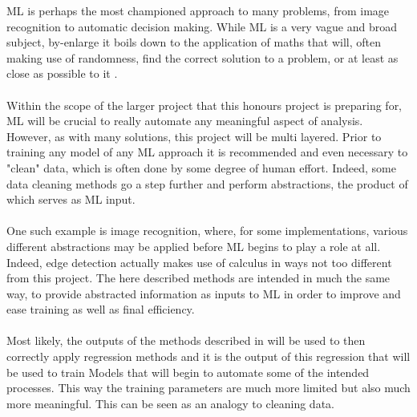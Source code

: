 \documentclass[main.tex]{subfiles}
\begin{document}
    ML is perhaps the most championed approach to many problems, from image recognition to automatic decision making. While ML is a very vague and broad subject, by-enlarge it boils down to the application of maths that will, often making use of randomness, find the correct solution to a problem, or at least as close as possible to it \cite[Page~5]{definitionML}.
    \\\\
    Within the scope of the larger project that this honours project is preparing for, ML will be crucial to really automate any meaningful aspect of analysis. However, as with many solutions, this project will be multi layered. Prior to training any model of any ML approach  it is recommended and even necessary to "clean" data, which is often done by some degree of human effort. Indeed, some data cleaning methods go a step further and perform abstractions, the product of which serves as ML input. 
    \\\\
    One such example is image recognition, where, for some implementations, various different abstractions may be applied before ML begins to play a role at all. Indeed, edge detection actually makes use of calculus in ways not too different from this project. The here described methods are intended in much the same way, to provide abstracted information as inputs to ML in order to improve and ease training as well as final efficiency.
    \\\\
    Most likely, the outputs of the methods described in  will be used to then correctly apply regression methods and it is the output of this regression that will be used to train Models that will begin to automate some of the intended processes. This way the training parameters are much more limited but also much more meaningful. This can be seen as an analogy to cleaning data. 
    
\end{document}
